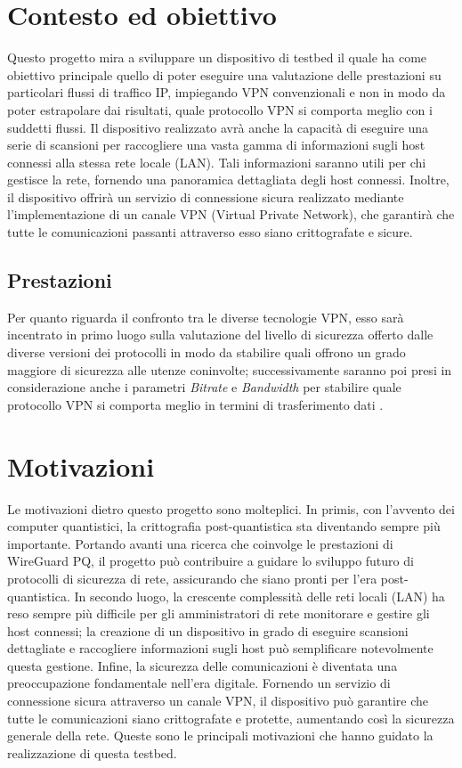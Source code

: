 \section{Contesto ed obiettivo} { 
Questo progetto mira a sviluppare un dispositivo di testbed \cite{testbed} il quale ha come obiettivo principale quello di poter eseguire una valutazione delle prestazioni su particolari flussi di traffico IP, impiegando VPN convenzionali e non in modo da poter estrapolare dai risultati, quale protocollo VPN si comporta meglio con i suddetti flussi. Il dispositivo realizzato avrà anche la capacità di eseguire una serie di scansioni per raccogliere una vasta gamma di informazioni sugli host connessi alla stessa rete locale (LAN). Tali informazioni saranno utili per chi gestisce la rete, fornendo una panoramica dettagliata degli host connessi. Inoltre, il dispositivo offrirà un servizio di connessione sicura realizzato mediante l’implementazione di un canale VPN (Virtual Private Network), che garantirà che tutte le comunicazioni passanti attraverso esso siano crittografate e sicure.

\subsection{Prestazioni}
Per quanto riguarda il confronto tra le diverse tecnologie VPN,  esso sarà incentrato in primo luogo sulla valutazione del livello di sicurezza offerto dalle diverse versioni dei protocolli in modo da stabilire quali offrono un grado maggiore di sicurezza alle utenze coninvolte; successivamente saranno poi presi in considerazione anche i parametri \emph{Bitrate} e \emph{Bandwidth} per stabilire quale protocollo VPN si comporta meglio in termini di trasferimento dati \cite{param}.

\section{Motivazioni}
Le motivazioni dietro questo progetto sono molteplici. In primis, con l’avvento dei computer quantistici, la crittografia post-quantistica sta diventando sempre più importante. Portando avanti una ricerca che coinvolge le prestazioni di WireGuard PQ, il progetto può contribuire a guidare lo sviluppo futuro di protocolli di sicurezza di rete, assicurando che siano pronti per l’era post-quantistica. In secondo luogo, la crescente complessità delle reti locali (LAN) ha reso sempre più difficile per gli amministratori di rete monitorare e gestire gli host connessi; la creazione di un dispositivo in grado di eseguire scansioni dettagliate e raccogliere informazioni sugli host può semplificare notevolmente questa gestione. Infine, la sicurezza delle comunicazioni è diventata una preoccupazione fondamentale nell’era digitale. Fornendo un servizio di connessione sicura attraverso un canale VPN, il dispositivo può garantire che tutte le comunicazioni siano crittografate e protette, aumentando così la sicurezza generale della rete. Queste sono le principali motivazioni che hanno guidato la realizzazione di questa testbed.

}
